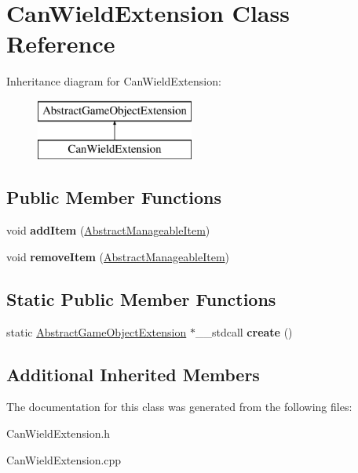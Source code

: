 \hypertarget{class_can_wield_extension}{}\section{Can\+Wield\+Extension Class Reference}
\label{class_can_wield_extension}
Inheritance diagram for Can\+Wield\+Extension\+:\begin{figure}[H]
\begin{center}
\leavevmode
\includegraphics[height=2.000000cm]{class_can_wield_extension}
\end{center}
\end{figure}
\subsection*{Public Member Functions}
\begin{DoxyCompactItemize}
\item 
\mbox{\label{class_can_wield_extension_a1ffe84dc23c27890b0efcf0fc5aa43a0}} 
void {\bfseries add\+Item} (\mbox{\hyperlink{class_abstract_manageable_item}{Abstract\+Manageable\+Item}})
\item 
\mbox{\label{class_can_wield_extension_a49c43410be01b7504ff4f9af9ee43459}} 
void {\bfseries remove\+Item} (\mbox{\hyperlink{class_abstract_manageable_item}{Abstract\+Manageable\+Item}})
\end{DoxyCompactItemize}
\subsection*{Static Public Member Functions}
\begin{DoxyCompactItemize}
\item 
\mbox{\label{class_can_wield_extension_abd3f9d8c241cf152f8118872301f318f}} 
static \mbox{\hyperlink{class_abstract_game_object_extension}{Abstract\+Game\+Object\+Extension}} $\ast$\+\_\+\+\_\+stdcall {\bfseries create} ()
\end{DoxyCompactItemize}
\subsection*{Additional Inherited Members}


The documentation for this class was generated from the following files\+:\begin{DoxyCompactItemize}
\item 
Can\+Wield\+Extension.\+h\item 
Can\+Wield\+Extension.\+cpp\end{DoxyCompactItemize}
